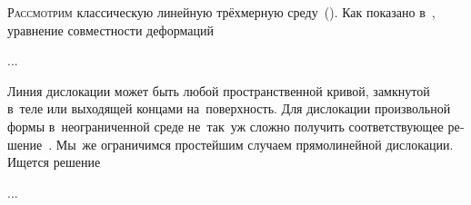 

\thispagestyle{empty}

\label{chapter:defects}



\label{para:volterradislocations}

\begin{otherlanguage}{russian}

\lettrine[lines=2, findent=2pt, nindent=0pt]{Р}{ассмотрим} классическую линейную трёхмерную среду~(). Как показано в~, уравнение совместности деформаций

...



\end{otherlanguage}



\label{para:rectilineardislocations}

\begin{otherlanguage}{russian}

Линия дислокации может быть любой пространственной кривой, замкнутой в~теле или выходящей концами на~поверхность. Для дислокации произвольной формы в~неограниченной среде не~так~уж сложно получить соответствующее решение~\cite{eshelby-theoryofdislocations}. Мы~же ограничимся простейшим случаем прямо\-линей\-ной дислокации. Ищется решение

...



\end{otherlanguage}


